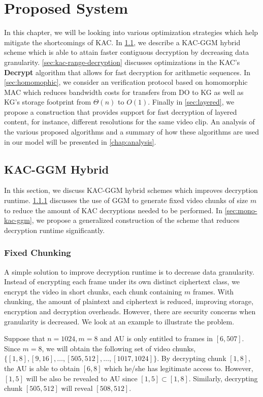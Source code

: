 \documentclass[hyp,a4paper,12pt,openbib]{socreport}
\begin{document}
\chapter{Proposed System}
\label{chap:implementation}

In this chapter, we will be looking into various optimization strategies which help mitigate the shortcomings of KAC. In \cref{sec:kac-ggm-hybrid}, we describe a KAC-GGM hybrid scheme which is able to attain faster contiguous decryption by decreasing data granularity. \cref{sec:kac-range-decryption} discusses optimizations in the KAC's \textbf{Decrypt} algorithm that allows for fast decryption for arithmetic sequences. In \cref{sec:homomophic}, we consider an verification protocol based on homomorphic MAC which reduces bandwidth costs for transfers from DO to KG as well as KG's storage footprint from $\Theta(n)$ to $O(1)$. Finally in \cref{sec:layered}, we propose a construction that provides support for fast decryption of layered content, for instance, different resolutions for the same video clip. An analysis of the various proposed algorithms and a summary of how these algorithms are used in our model will be presented in \cref{chap:analysis}.

\section{KAC-GGM Hybrid}
\label{sec:kac-ggm-hybrid}
In this section, we discuss KAC-GGM hybrid schemes which improves decryption runtime. \cref{sec:kac-ggm} discusses the use of GGM to generate fixed video chunks of size $m$ to reduce the amount of KAC decryptions needed to be performed. In \cref{sec:mono-kac-ggm}, we propose a generalized construction of the scheme that reduces decryption runtime significantly.      


\subsection{Fixed Chunking}
\label{sec:kac-ggm}
A simple solution to improve decryption runtime is to decrease data granularity. Instead of encrypting each frame under its own distinct ciphertext class, we encrypt the video in short chunks, each chunk containing $m$ frames. With chunking, the amount of plaintext and ciphertext is reduced, improving storage, encryption and decryption overheads. However, there are security concerns when granularity is decreased. We look at an example to illustrate the problem. 

Suppose that $n=1024, m=8$ and AU is only entitled to frames in $[6,507]$. Since $m=8$, we will obtain the following set of video chunks, $\{[1,8], [9,16], \dots, [505,512], \dots, [1017,1024] \}$. By decrypting chunk $[1,8]$, the AU is able to obtain $[6,8]$ which he/she has legitimate access to. However, $[1,5]$ will be also be revealed to AU since $[1,5] \subset [1,8]$. Similarly, decrypting chunk $[505,512]$ will reveal $[508,512]$. 
\end{document}
